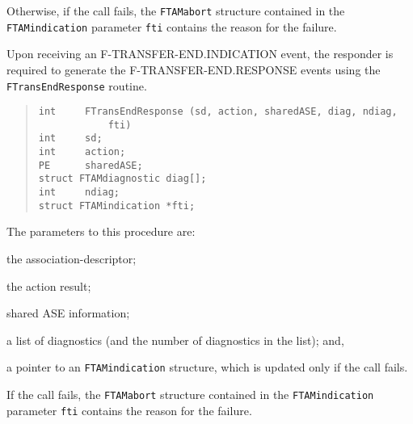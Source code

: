 Otherwise, if the call fails,
the \verb"FTAMabort" structure contained in the
\verb"FTAMindication" parameter \verb"fti" contains the reason for the failure.

Upon receiving an {\sf F-TRANSFER-END.INDICATION\/} event,
the responder is required to generate the {\sf F-TRANSFER-END.RESPONSE\/}
events using the \verb"FTransEndResponse" routine.
\begin{quote}\small\begin{verbatim}
int     FTransEndResponse (sd, action, sharedASE, diag, ndiag,
            fti)
int     sd;
int     action;
PE      sharedASE;
struct FTAMdiagnostic diag[];
int     ndiag;
struct FTAMindication *fti;
\end{verbatim}\end{quote}
The parameters to this procedure are:
\begin{describe}
\item[\verb"sd":] the association-descriptor;

\item[\verb"action":] the action result;

\item[\verb"sharedASE":] shared ASE information;

\item[\verb"diag"/\verb"ndiag":] a list of diagnostics
(and the number of diagnostics in the list);
and,

\item[\verb"fti":] a pointer to an \verb"FTAMindication" structure, which is
updated only if the call fails.
\end{describe}
If the call fails,
the \verb"FTAMabort" structure contained in the
\verb"FTAMindication" parameter \verb"fti" contains the reason for the failure.


